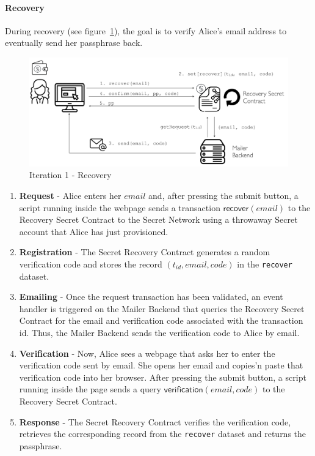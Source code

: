 \documentclass[12pt]{article}
\newcommand{\ms}[1]{\ensuremath{\mathsf{#1}}}
\begin{document}
\paragraph{Recovery}

During recovery (see figure~\ref{it1:recovery}), the goal is to verify Alice's email address to eventually send her passphrase back. 


\begin{figure}
  \includegraphics[width=\linewidth]{./media/media-002.png}
  \caption{Iteration 1 - Recovery}
  \label{it1:recovery}
\end{figure}

\begin{enumerate}
\item {\bf Request} - Alice enters her $email$ and, after pressing the submit button, a script running inside the webpage sends a transaction {\bf $\ms{recover}(email)$} to the Recovery Secret Contract to the Secret Network using a throwaway Secret account that Alice has just provisioned. 
\item {\bf Registration} - The Secret Recovery Contract generates a random verification code and stores the record $(t_{id}, email, code)$ in the {\tt recover} dataset. 
\item {\bf Emailing} - Once the request transaction has been validated, an event handler is triggered on the Mailer Backend that queries the Recovery Secret Contract for the email and verification code associated with the transaction id. Thus, the Mailer Backend sends the verification code to Alice by email. 
\item {\bf Verification} - Now, Alice sees a webpage that asks her to enter the verification code sent by email. She opens her email and copies'n paste that verification code into her browser. After pressing the submit button, a script running inside the page sends a query $\ms{verification}(email, code)$ to the Recovery Secret Contract. 
\item {\bf Response} - The Secret Recovery Contract verifies the verification code, retrieves the corresponding record from the {\tt recover} dataset and returns the passphrase.
\end{enumerate}
\end{document}

